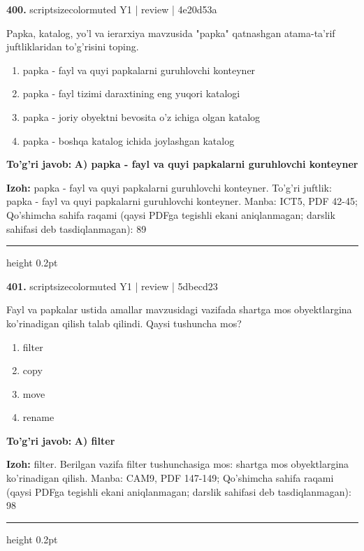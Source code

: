 \documentclass[10pt,a4paper]{article}
\begin{document}
{\bfseries\sffamily\color{ink} 400.} {scriptsizecolor{muted} Y1 | review | 4e20d53a}
\par
Papka, katalog, yo'l va ierarxiya mavzusida "papka" qatnashgan atama-ta'rif juftliklaridan to'g'risini toping.
\begin{enumerate}[label=\Alph*),leftmargin=9mm]
\item papka - fayl va quyi papkalarni guruhlovchi konteyner
\item papka - fayl tizimi daraxtining eng yuqori katalogi
\item papka - joriy obyektni bevosita o'z ichiga olgan katalog
\item papka - boshqa katalog ichida joylashgan katalog
\end{enumerate}
\begin{tcolorbox}[enhanced,breakable,colback=teal!4,colframe=teal!60!black,boxrule=0.45pt,arc=1.2mm,left=2.7mm,right=2.7mm,top=1.8mm,bottom=1.8mm,before skip=2mm,after skip=2mm]
{\bfseries\sffamily\color{teal}To'g'ri javob:} \textbf{A) papka - fayl va quyi papkalarni guruhlovchi konteyner}
\par\smallskip
{\bfseries Izoh:} papka - fayl va quyi papkalarni guruhlovchi konteyner. To'g'ri juftlik: papka - fayl va quyi papkalarni guruhlovchi konteyner. Manba: ICT5, PDF 42-45; Qo'shimcha sahifa raqami (qaysi PDFga tegishli ekani aniqlanmagan; darslik sahifasi deb tasdiqlanmagan): 89
\end{tcolorbox}
\vspace{2mm}\hrule height 0.2pt\vspace{3mm}

{\bfseries\sffamily\color{ink} 401.} {scriptsizecolor{muted} Y1 | review | 5dbecd23}
\par
Fayl va papkalar ustida amallar mavzusidagi vazifada shartga mos obyektlargina ko'rinadigan qilish talab qilindi. Qaysi tushuncha mos?
\begin{enumerate}[label=\Alph*),leftmargin=9mm]
\item filter
\item copy
\item move
\item rename
\end{enumerate}
\begin{tcolorbox}[enhanced,breakable,colback=teal!4,colframe=teal!60!black,boxrule=0.45pt,arc=1.2mm,left=2.7mm,right=2.7mm,top=1.8mm,bottom=1.8mm,before skip=2mm,after skip=2mm]
{\bfseries\sffamily\color{teal}To'g'ri javob:} \textbf{A) filter}
\par\smallskip
{\bfseries Izoh:} filter. Berilgan vazifa filter tushunchasiga mos: shartga mos obyektlargina ko'rinadigan qilish. Manba: CAM9, PDF 147-149; Qo'shimcha sahifa raqami (qaysi PDFga tegishli ekani aniqlanmagan; darslik sahifasi deb tasdiqlanmagan): 98
\end{tcolorbox}
\vspace{2mm}\hrule height 0.2pt\vspace{3mm}
\end{document}
